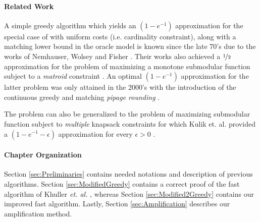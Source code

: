 \paragraph*{Related Work}

A simple greedy algorithm which yields an $(1-e^{-1})$ approximation for the special
case of \SK with uniform costs (i.e. cardinality constraint), along with a matching 
lower bound in the oracle model is known since the late 70's due to the
works of Nemhauser, Wolsey and Fisher \cite{Nemhauser1978}\cite{NW78}.
Their works also achieved a $\nicefrac[]{1}{2}$ approximation for the problem
of maximizing a monotone submodular function subject to a {\em matroid}
constraint \cite{FNW78}. 
An optimal $(1-e^{-1})$ approximation for the latter problem was only attained in the 2000's with 
the introduction of the {continuous greedy} and matching 
	{\em pipage rounding } \cite{CCPV11}.

The problem can also be generalized to the problem of maximizing submodular function
subject to {\em multiple} knapsack constraints for which Kulik et. al. provided a $(1-e^{-1}-\epsilon)$ approximation for every $\epsilon>0$ \cite{KST13}.  


\paragraph*{Chapter Organization}
Section \ref{sec:Preliminaries} contains needed notations and description of previous algorithms.
Section \ref{sec:ModifiedGreedy} contains a correct proof of the fast algorithm of Khuller {\em et. al.} \cite{khuller1999budgeted}, whereas Section \ref{sec:Modified2Greedy} contains our improved fast algorithm.
Lastly, Section \ref{sec:Amplification} describes our amplification method. 
